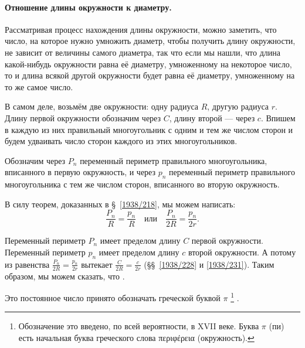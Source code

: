 \documentclass[oneside]{book}
\begin{document}

\paragraph{Отношение длины окружности к диаметру.}\label{1938/238}
Рассматривая процесс нахождения длины окружности, можно заметить, что число, на которое нужно умножить диаметр, чтобы получить длину окружности, не зависит от величины самого диаметра, так что если мы нашли, что длина какой-нибудь окружности равна её диаметру, умноженному на некоторое число, то и длина всякой другой окружности будет равна её диаметру, умноженному на то же самое число.

В самом деле, возьмём две окружности:
одну радиуса $R$, другую радиуса $r$.
Длину первой окружности обозначим через $C$, длину второй — через $c$.
Впишем в каждую из них правильный многоугольник с одним и тем же числом сторон и будем удваивать число сторон каждого из этих многоугольников.

Обозначим через $P_n$ переменный периметр правильного многоугольника, вписанного в первую окружность, и через $p_n$ переменный периметр правильного многоугольника с тем же числом сторон, вписанного во вторую окружность.

В силу теорем, доказанных в §~\ref{1938/218}, мы можем написать:
\[\frac{P_n}{R}=\frac{p_n}{R}
\quad\text{или}\quad
\frac{P_n}{2R}=\frac{p_n}{2r}.\]

Переменный периметр $P_n$ имеет пределом длину $C$ первой окружности.
Переменный периметр $p_n$ имеет пределом длину $c$ второй окружности.
А потому из равенства $\frac{P_n}{2R}=\frac{p_n}{2r}$ вытекает $\frac{C}{2R}=\frac{c}{2r}$
(§§~\ref{1938/228} и \ref{1938/231}).
Таким образом, мы можем сказать, что . %

Это постоянное число принято обозначать греческой буквой $\pi$%
\footnote{Обозначение это введено, по всей вероятности, в XVII веке.
Буква $\pi$ (пи) есть начальная буква греческого слова \textgreek{περιφέρεια} (окружность).}%
.
\end{document}
